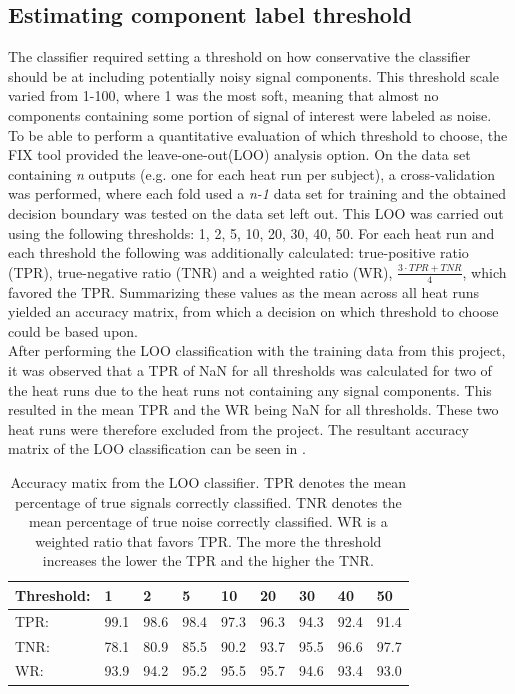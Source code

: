 \subsection{Estimating component label threshold}
The classifier required setting a threshold on how conservative the classifier should be at including potentially noisy signal components. This threshold scale varied from 1-100, where 1 was the most soft, meaning that almost no components containing some portion of signal of interest were labeled as noise. \\
To be able to perform a quantitative evaluation of which threshold to choose, the FIX tool provided the leave-one-out(LOO) analysis option. On the data set containing \textit{n} outputs (e.g. one for each heat run per subject), a cross-validation was performed, where each fold used a \textit{n-1} data set for training and the obtained decision boundary was tested on the data set left out. This LOO was carried out using the following thresholds: 1, 2, 5, 10, 20, 30, 40, 50. For each heat run and each threshold the following was additionally calculated: true-positive ratio (TPR), true-negative ratio (TNR) and a weighted ratio (WR), $\frac{3\cdot TPR+TNR}{4}$, which favored the TPR. Summarizing these values as the mean across all heat runs yielded an accuracy matrix, from which a decision on which threshold to choose could be based upon. \\
After performing the LOO classification with the training data from this project, it was observed that a TPR of NaN for all thresholds was calculated for two of the heat runs due to the heat runs not containing any signal components. This resulted in the mean TPR and the WR being NaN for all thresholds. These two heat runs were therefore excluded from the project. The resultant accuracy matrix of the LOO classification can be seen in .

\begin{table}[H] 
	\caption{Accuracy matix from the LOO classifier. TPR denotes the mean percentage of true signals correctly classified. TNR denotes the mean percentage of true noise correctly classified. WR is a weighted ratio that favors TPR. The more the threshold increases the lower the TPR and the higher the TNR.}\label{tab:decisionmatrix}
	\begin{tabular}{l|llllllll}
		Threshold:                              & 1    & 2    & 5    & 10   & 20   & 30   & 40   & 50   \\ \hline
		TPR:                                    & 99.1 & 98.6 & 98.4 & 97.3 & 96.3 & 94.3 & 92.4 & 91.4 \\ %
		TNR:                                    & 78.1 & 80.9 & 85.5 & 90.2 & 93.7 & 95.5 & 96.6 & 97.7 \\ %
		WR: & 93.9 & 94.2 & 95.2 & 95.5 & 95.7 & 94.6 & 93.4 & 93.0
	\end{tabular}
\end{table}


